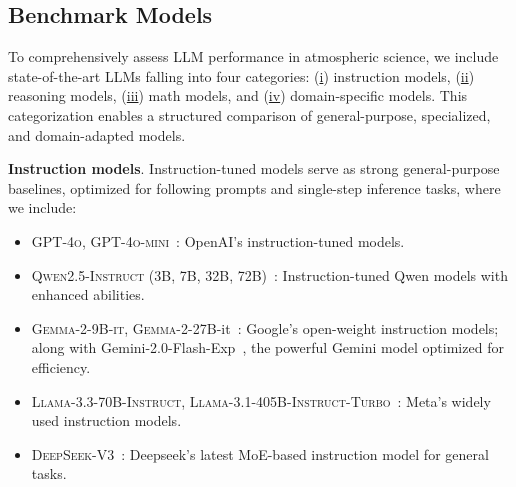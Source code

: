 

















\subsection{Benchmark Models}

To comprehensively assess LLM performance in atmospheric science, we include state-of-the-art LLMs falling into four categories: (\underline{i}) instruction models, (\underline{ii}) reasoning models, (\underline{iii}) math models, and (\underline{iv}) domain-specific models. This categorization enables a structured comparison of general-purpose, specialized, and domain-adapted models.

\textbf{Instruction models}. Instruction-tuned models serve as strong general-purpose baselines, optimized for following prompts and single-step inference tasks, where we include:

\begin{itemize}[topsep=5pt, leftmargin=1em]
\vspace{-0.5em}
\item \textsc{GPT-4o}, \textsc{GPT-4o-mini}~\cite{gpt4o}: OpenAI’s instruction-tuned models.

\vspace{-0.35em}
\item \textsc{Qwen2.5-Instruct} (3B, 7B, 32B, 72B)~\cite{qwen2.5}: Instruction-tuned Qwen models with enhanced abilities.

\vspace{-0.35em}
\item \textsc{Gemma-2-9B-it}, \textsc{Gemma-2-27B}-it~\cite{gemmateam2024gemma2improvingopen}: Google’s open-weight instruction models; along with Gemini-2.0-Flash-Exp~\cite{deepmind_gemini_flash}, the powerful Gemini model optimized for efficiency.

\vspace{-0.35em}
\item \textsc{Llama-3.3-70B-Instruct}, \textsc{Llama-3.1-405B-Instruct-Turbo}~\cite{grattafiori2024llama3herdmodels}: Meta’s widely used instruction models.

\vspace{-0.35em}
\item \textsc{DeepSeek-V3}~\cite{deepseekai2024deepseekv3technicalreport}: Deepseek's latest MoE-based instruction model for general tasks.
\vspace{-0.5em}
\end{itemize}


